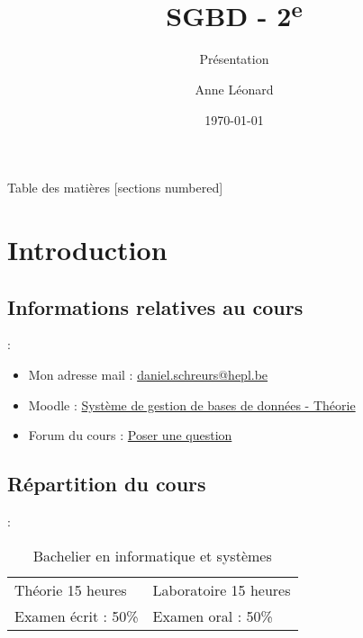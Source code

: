 \documentclass[10pt]{beamer}
\title{SGBD - 2\textsuperscript{e}}
\subtitle{Présentation}
\date{\today}
\author{Anne Léonard}
\institute{Haute École de la Province de Liège}
\begin{document}
\maketitle

\begin{frame}[allowframebreaks]{Table des matières}
    [sections numbered]
    \tableofcontents
\end{frame}

\section{Introduction}

\subsection{Informations relatives au cours}
\begin{frame}{\secname : \subsecname}
    \begin{itemize}
        \item Mon adresse mail : \href{mailto:daniel.schreurs@hepl.be}{daniel.schreurs@hepl.be}
        \item Moodle : \href{https://moodle.ecolevirtuelle.be/course/view.php?id=36916}{Système de gestion de bases de données - Théorie}
        \item Forum du cours : \href{https://moodle.ecolevirtuelle.be/mod/forum/view.php?id=246662}{Poser une question}
    \end{itemize}
\end{frame}


\subsection{Répartition du cours}
\begin{frame}{\secname : \subsecname}
    \begin{table}[]
        \begin{tabular}{ll}
            Théorie 15 heures   & Laboratoire 15 heures \\
            Examen écrit : 50\% & Examen oral : 50\%
        \end{tabular}
        \caption*{Bachelier en informatique et systèmes}
    \end{table}
\end{frame}
\end{document}
